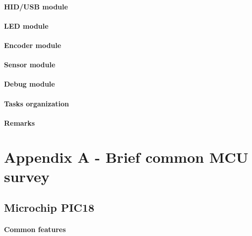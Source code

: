 \documentclass[a4paper,10pt]{article}
\begin{document}
\begin{multicols}{2}
\paragraph{HID/USB module}
\TODO


\paragraph{LED module}
\TODO


\paragraph{Encoder module}
\TODO


\paragraph{Sensor module}
\TODO


\paragraph{Debug module}
\TODO


\paragraph{Tasks organization}
\TODO


\paragraph{Remarks}
\TODO


\section{Appendix A - Brief common MCU survey}

\TODO


\subsection{Microchip PIC18}

\TODO


\paragraph{Common features}
\TODO



\end{multicols}
\end{document}
